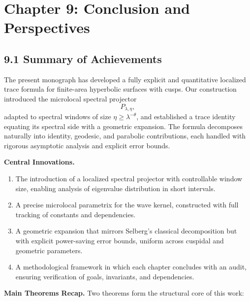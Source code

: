 
\section*{Chapter 9: Conclusion and Perspectives}

\subsection{9.1 Summary of Achievements}

The present monograph has developed a fully explicit and quantitative localized trace formula for finite-area hyperbolic surfaces with cusps. Our construction introduced the microlocal spectral projector
\[
  P_{\lambda,\eta},
\]
adapted to spectral windows of size $\eta \geq \lambda^{-\theta}$, and established a trace identity equating its spectral side with a geometric expansion. The formula decomposes naturally into identity, geodesic, and parabolic contributions, each handled with rigorous asymptotic analysis and explicit error bounds.

\medskip

\noindent\textbf{Central Innovations.}
\begin{enumerate}
  \item The introduction of a localized spectral projector with controllable window size, enabling analysis of eigenvalue distribution in short intervals.
  \item A precise microlocal parametrix for the wave kernel, constructed with full tracking of constants and dependencies.
  \item A geometric expansion that mirrors Selberg’s classical decomposition but with explicit power-saving error bounds, uniform across cuspidal and geometric parameters.
  \item A methodological framework in which each chapter concludes with an audit, ensuring verification of goals, invariants, and dependencies.
\end{enumerate}

\medskip

\noindent\textbf{Main Theorems Recap.}
Two theorems form the structural core of this work:

